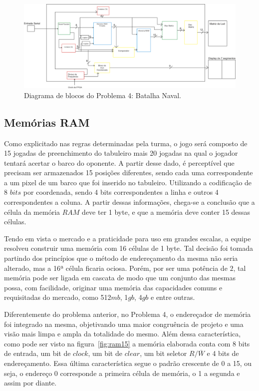 \documentclass[12pt]{article}
\begin{document}
\begin{figure}[h]
\centering
\includegraphics[width=1\textwidth]{img/diagrama.png}
\caption{Diagrama de blocos do Problema 4: Batalha Naval.}
\label{fig:diagrama}
\end{figure}


\subsection{Memórias RAM}

Como explicitado nas regras determinadas pela turma, o jogo será composto de 15 jogadas de preenchimento do tabuleiro mais 20 jogadas na qual o jogador tentará acertar o barco do oponente. A partir desse dado, é perceptível que precisam ser armazenados 15 posições diferentes, sendo cada uma correspondente a um pixel de um barco que foi inserido no tabuleiro. Utilizando a codificação de 8 $bits$ por coordenada, sendo 4 bits correspondentes a linha e outros 4 correspondentes a coluna. A partir dessas informações, chega-se a conclusão que a célula da memória $RAM$ deve ter 1 byte, e que a memória deve conter 15 dessas células.

Tendo em vista o mercado e a praticidade para uso em grandes escalas, a equipe resolveu construir uma memória com 16 células de 1 byte. Tal decisão foi tomada partindo dos princípios que o método de endereçamento da mesma não seria alterado, mas a 16ª célula ficaria ociosa. Porém, por ser uma potência de $2$, tal memória pode ser ligada em cascata de modo que um conjunto das mesmas possa, com facilidade, originar uma memória das capacidades comuns e requisitadas do mercado, como 512$mb$, 1$gb$, 4$gb$ e entre outras.

Diferentemente do problema anterior, no Problema 4, o endereçador de memória foi integrado na mesma, objetivando uma maior congruência de projeto e uma visão mais limpa e ampla da totalidade do mesmo. Além dessa característica, como pode ser visto na figura~\ref{fig:ram15} a memória elaborada conta com 8 bits de entrada, um bit de $clock$, um bit de $clear$, um bit seletor $R/\overline{W}$ e 4 bits de endereçamento. Essa última característica segue o padrão crescente de 0 a 15, ou seja, o endereço 0 corresponde a primeira célula de memória, o 1 a segunda e assim por diante.
\end{document}
